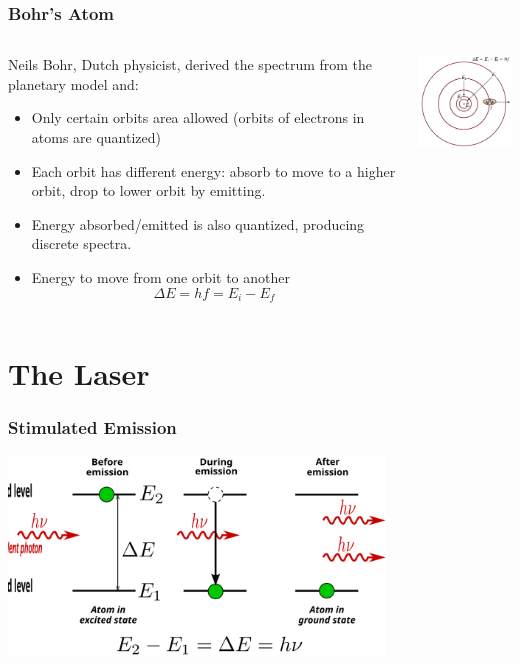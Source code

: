 \documentclass{beamer}
\begin{document}
\begin{frame}\frametitle{Bohr's Atom}
\begin{columns}
\begin{column}{7cm}
Neils Bohr, Dutch physicist, derived the spectrum from the planetary model and:
\begin{itemize}
\item Only certain orbits area allowed (orbits of electrons in atoms are quantized)
\item Each orbit has different energy: absorb to move to a higher orbit, drop to lower orbit by emitting.
\item Energy absorbed/emitted is also quantized, producing discrete spectra.
\item Energy to move from one orbit to another
\[ \Delta E = hf = E_i - E_f\]
\end{itemize}
\end{column}
\begin{column}{4.5cm}
\begin{center}
\includegraphics[width=4cm]{fig/bohr.jpg}
\end{center}
\end{column}
\end{columns}
\end{frame}

\section{The Laser}

\begin{frame}\frametitle{Stimulated Emission}
\begin{center}
\includegraphics[width=10cm]{fig/laser1.png}
\end{center}
\end{frame}
\end{document}
